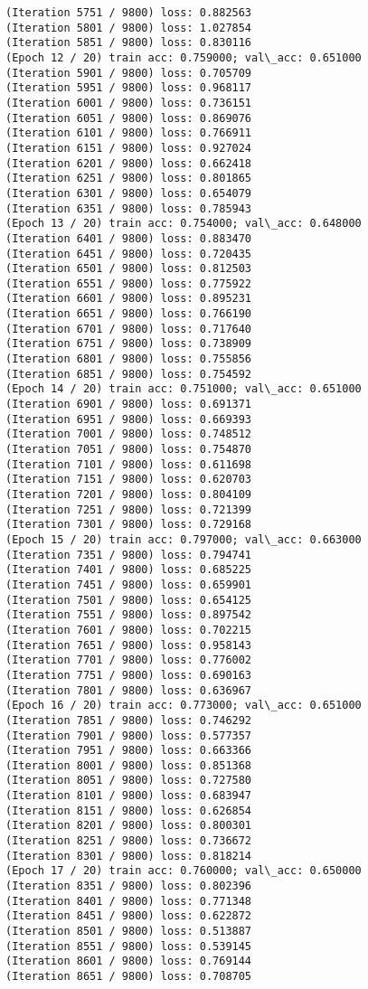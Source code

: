 \documentclass[11pt]{article}
\begin{document}
\begin{Verbatim}[commandchars=\\\{\}]
(Iteration 5751 / 9800) loss: 0.882563
(Iteration 5801 / 9800) loss: 1.027854
(Iteration 5851 / 9800) loss: 0.830116
(Epoch 12 / 20) train acc: 0.759000; val\_acc: 0.651000
(Iteration 5901 / 9800) loss: 0.705709
(Iteration 5951 / 9800) loss: 0.968117
(Iteration 6001 / 9800) loss: 0.736151
(Iteration 6051 / 9800) loss: 0.869076
(Iteration 6101 / 9800) loss: 0.766911
(Iteration 6151 / 9800) loss: 0.927024
(Iteration 6201 / 9800) loss: 0.662418
(Iteration 6251 / 9800) loss: 0.801865
(Iteration 6301 / 9800) loss: 0.654079
(Iteration 6351 / 9800) loss: 0.785943
(Epoch 13 / 20) train acc: 0.754000; val\_acc: 0.648000
(Iteration 6401 / 9800) loss: 0.883470
(Iteration 6451 / 9800) loss: 0.720435
(Iteration 6501 / 9800) loss: 0.812503
(Iteration 6551 / 9800) loss: 0.775922
(Iteration 6601 / 9800) loss: 0.895231
(Iteration 6651 / 9800) loss: 0.766190
(Iteration 6701 / 9800) loss: 0.717640
(Iteration 6751 / 9800) loss: 0.738909
(Iteration 6801 / 9800) loss: 0.755856
(Iteration 6851 / 9800) loss: 0.754592
(Epoch 14 / 20) train acc: 0.751000; val\_acc: 0.651000
(Iteration 6901 / 9800) loss: 0.691371
(Iteration 6951 / 9800) loss: 0.669393
(Iteration 7001 / 9800) loss: 0.748512
(Iteration 7051 / 9800) loss: 0.754870
(Iteration 7101 / 9800) loss: 0.611698
(Iteration 7151 / 9800) loss: 0.620703
(Iteration 7201 / 9800) loss: 0.804109
(Iteration 7251 / 9800) loss: 0.721399
(Iteration 7301 / 9800) loss: 0.729168
(Epoch 15 / 20) train acc: 0.797000; val\_acc: 0.663000
(Iteration 7351 / 9800) loss: 0.794741
(Iteration 7401 / 9800) loss: 0.685225
(Iteration 7451 / 9800) loss: 0.659901
(Iteration 7501 / 9800) loss: 0.654125
(Iteration 7551 / 9800) loss: 0.897542
(Iteration 7601 / 9800) loss: 0.702215
(Iteration 7651 / 9800) loss: 0.958143
(Iteration 7701 / 9800) loss: 0.776002
(Iteration 7751 / 9800) loss: 0.690163
(Iteration 7801 / 9800) loss: 0.636967
(Epoch 16 / 20) train acc: 0.773000; val\_acc: 0.651000
(Iteration 7851 / 9800) loss: 0.746292
(Iteration 7901 / 9800) loss: 0.577357
(Iteration 7951 / 9800) loss: 0.663366
(Iteration 8001 / 9800) loss: 0.851368
(Iteration 8051 / 9800) loss: 0.727580
(Iteration 8101 / 9800) loss: 0.683947
(Iteration 8151 / 9800) loss: 0.626854
(Iteration 8201 / 9800) loss: 0.800301
(Iteration 8251 / 9800) loss: 0.736672
(Iteration 8301 / 9800) loss: 0.818214
(Epoch 17 / 20) train acc: 0.760000; val\_acc: 0.650000
(Iteration 8351 / 9800) loss: 0.802396
(Iteration 8401 / 9800) loss: 0.771348
(Iteration 8451 / 9800) loss: 0.622872
(Iteration 8501 / 9800) loss: 0.513887
(Iteration 8551 / 9800) loss: 0.539145
(Iteration 8601 / 9800) loss: 0.769144
(Iteration 8651 / 9800) loss: 0.708705

\end{Verbatim}
\end{document}
